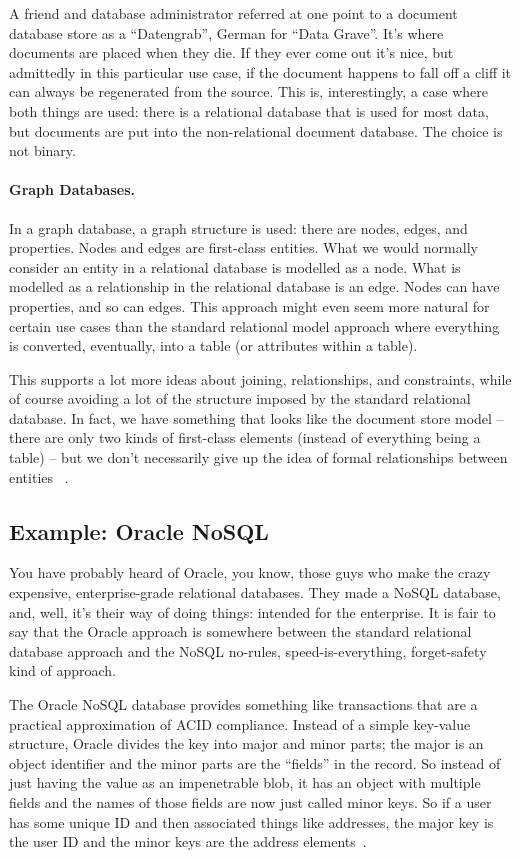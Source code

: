 \documentclass[a4paper]{report}
\begin{document}
A friend and database administrator referred at one point to a document database store as a ``Datengrab'', German for ``Data Grave''. It's where documents are placed when they die. If they ever come out it's nice, but admittedly in this particular use case, if the document happens to fall off a cliff it can always be regenerated from the source. This is, interestingly, a case where both things are used: there is a relational database that is used for most data, but documents are put into the non-relational document database. The choice is not binary.

\paragraph{Graph Databases.}
In a graph database, a graph structure is used: there are nodes, edges, and properties. Nodes and edges are first-class entities. What we would normally consider an entity in a relational database is modelled as a node. What is modelled as a relationship in the relational database is an edge. Nodes can have properties, and so can edges. This approach might even seem more natural for certain use cases than the standard relational model approach where everything is converted, eventually, into a table (or attributes within a table). 

This supports a lot more ideas about joining, relationships, and constraints, while of course avoiding a lot of the structure imposed by the standard relational database. In fact, we have something that looks like the document store model -- there are only two kinds of first-class elements (instead of everything being a table) --  but we don't necessarily give up the idea of formal relationships between entities ~\cite{graphdb}.


\subsection*{Example: Oracle NoSQL}
You have probably heard of Oracle, you know, those guys who make the crazy expensive, enterprise-grade relational databases. They made a NoSQL database, and, well, it's their way of doing things: intended for the enterprise. It is fair to say that the Oracle approach is somewhere between the standard relational database approach and the NoSQL no-rules, speed-is-everything, forget-safety kind of approach. 

The Oracle NoSQL database provides something like transactions that are a practical approximation of ACID compliance. Instead of a simple key-value structure, Oracle divides the key into major and minor parts; the major is an object identifier and the minor parts are the ``fields'' in the record. So instead of just having the value as an impenetrable blob, it has an object with multiple fields and the names of those fields are now just called minor keys. So if a user has some unique ID and then associated things like addresses, the major key is the user ID and the minor keys are the address elements~\cite{oraclenosql}.
\end{document}
